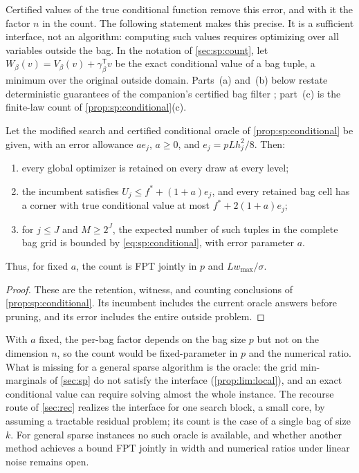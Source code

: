 Certified values of the true conditional function remove this error, and
with it the factor $n$ in the count. The following statement makes this
precise. It is a sufficient interface, not an algorithm: computing such
values requires optimizing over all variables outside the bag. In the
notation of \cref{sec:sp:count}, let
$W_\beta(v)=V_\beta(v)+\gamma_\beta^{\mathsf T}v$ be the exact conditional
value of a bag tuple, a minimum over the original outside domain. Parts~(a)
and~(b) below restate deterministic guarantees of the companion's certified
bag filter \citep{companion-decomposition-aware}; part~(c) is the
finite-law count of \cref{prop:sp:conditional}(c).

\begin{corollary}\label{prop:lim:conditional}
Let the modified search and certified conditional oracle of
\cref{prop:sp:conditional} be given, with an error allowance $ae_j$,
$a\ge0$, and $e_j=pLh_j^2/8$. Then:
\begin{enumerate}[label=(\alph*)]
\item\label{it:lim:cond-sound} every global optimizer is retained on every
 draw at every level;
\item\label{it:lim:cond-witness} the incumbent satisfies
 $U_j\le f^*+(1+a)e_j$, and every retained bag cell has a corner with true
 conditional value at most $f^*+2(1+a)e_j$;
\item\label{it:lim:cond-count} for $j\le J$ and $M\ge2^J$, the expected
 number of such tuples in the complete bag grid is bounded by
 \eqref{eq:sp:conditional}, with error parameter $a$.
\end{enumerate}
Thus, for fixed $a$, the count is FPT jointly in $p$ and $Lw_{\max}/\sigma$.
\end{corollary}

\begin{proof}
These are the retention, witness, and counting conclusions of
\cref{prop:sp:conditional}. Its incumbent includes the current oracle
answers before pruning, and its error includes the entire outside problem.
\end{proof}

With $a$ fixed, the per-bag factor depends on the bag size $p$ but not on
the dimension $n$, so the count would be fixed-parameter in $p$ and the
numerical ratio. What is missing for a general sparse algorithm is the
oracle: the grid min-marginals of \cref{sec:sp} do not satisfy the interface
(\cref{prop:lim:local}), and an exact conditional value can require solving
almost the whole instance. The recourse route of \cref{sec:rec} realizes the
interface for one search block, a small core, by assuming a tractable
residual problem; its count is the case of a single bag of size $k$. For
general sparse instances no such oracle is available, and whether another
method achieves a bound FPT jointly in width and numerical ratios under linear noise
remains open.

